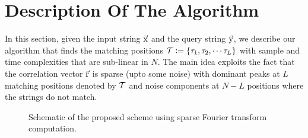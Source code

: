 \section{Description Of The Algorithm}
\label{sec:Algo_desc}
In this section, given the input string $\vec{\mathrm{x}}$ and the query string $\vec{\mathrm{y}}$, we describe our algorithm that finds the matching positions $\mathcal{T}\mathrel{\mathop:}= \{\tau_1, \tau_2, \cdots \tau_L\}$ with sample and time complexities that are sub-linear in $N$. The main idea exploits the fact that the correlation vector $\vec{\mathrm{r}}$ is sparse (upto some noise) with dominant peaks at $L$ matching positions denoted by $\mathcal{T}$ and noise components at $N-L$ positions where the strings do not match.


\begin{figure*}
  \centering 
	 	\resizebox{0.95\textwidth}{!}{}	
	\caption{Schematic of the proposed scheme using sparse Fourier transform computation.}\label{fig:notional}
\end{figure*}



